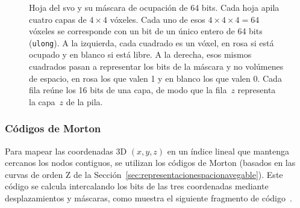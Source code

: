 \begin{figure}[htp]
  \caption[Hoja del \acrshort{svo} y su máscara de ocupación de 64 bits.]
  {Hoja del \acrshort{svo} y su máscara de ocupación de 64 bits.
  Cada hoja apila cuatro capas de $4\times4$ vóxeles. Cada uno de esos $4\times4\times4=64$ vóxeles se corresponde con un bit de un único entero de 64 bits (\texttt{ulong}).
  A la izquierda, cada cuadrado es un vóxel, en rosa si está ocupado y en blanco si está libre.
  A la derecha, esos mismos cuadrados pasan a representar los bits de la máscara y no volúmenes de espacio, en rosa los que valen 1 y en blanco los que valen 0.
  Cada fila reúne los 16 bits de una capa, de modo que la fila~$z$ representa la capa~$z$ de la pila.}
  \label{fig:hoja-mascara}
\end{figure}

\subsubsection{Códigos de Morton}

Para mapear las coordenadas 3D $(x, y, z)$ en un índice lineal que mantenga cercanos los nodos contiguos, se utilizan los códigos de Morton (basados en las curvas de orden Z de la Sección~\ref{sec:representacionespacionavegable}).
Este código se calcula intercalando los bits de las tres coordenadas mediante desplazamientos y máscaras, como muestra el siguiente fragmento de código~\cite{giesen2009decoding}.

